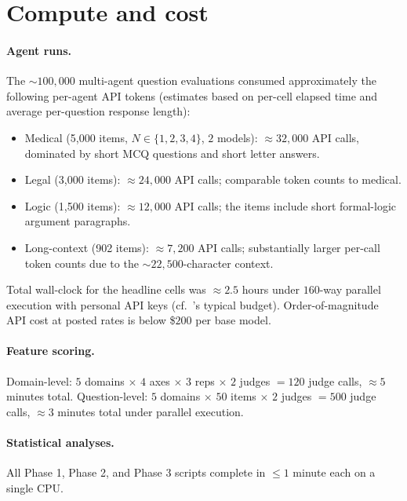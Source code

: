 \documentclass{article}
\begin{document}
\section{Compute and cost}
\label{app:compute}

\paragraph{Agent runs.} The $\sim$$100{,}000$ multi-agent question evaluations consumed approximately the following per-agent API tokens (estimates based on per-cell elapsed time and average per-question response length):

\begin{itemize}
\item Medical (5{,}000 items, $N\in\{1,2,3,4\}$, $2$ models): $\approx 32{,}000$ API calls, dominated by short MCQ questions and short letter answers.
\item Legal (3{,}000 items): $\approx 24{,}000$ API calls; comparable token counts to medical.
\item Logic (1{,}500 items): $\approx 12{,}000$ API calls; the items include short formal-logic argument paragraphs.
\item Long-context (902 items): $\approx 7{,}200$ API calls; substantially larger per-call token counts due to the $\sim$$22{,}500$-character context.
\end{itemize}

Total wall-clock for the headline cells was $\approx 2.5$ hours under $160$-way parallel execution with personal API keys (cf.\ \citet{wu2023autogen}'s typical budget). Order-of-magnitude API cost at posted rates is below \$$200$ per base model.

\paragraph{Feature scoring.} Domain-level: $5$ domains $\times$ $4$ axes $\times$ $3$ reps $\times$ $2$ judges $=120$ judge calls, $\approx 5$ minutes total. Question-level: $5$ domains $\times$ $50$ items $\times$ $2$ judges $=500$ judge calls, $\approx 3$ minutes total under parallel execution.

\paragraph{Statistical analyses.} All Phase 1, Phase 2, and Phase 3 scripts complete in $\leq 1$ minute each on a single CPU.
\end{document}
